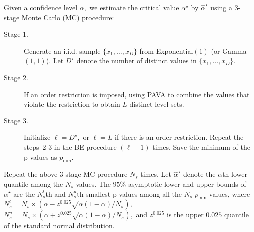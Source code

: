\documentclass[12pt] {article}
\begin{document}
Given a confidence level $\alpha,$ we estimate the critical value
$\alpha^\star$ by $\widehat{\alpha}^\star$ using a 3-stage Monte
Carlo (MC) procedure:
\begin{description}
\item[Stage 1.] Generate an i.i.d. sample $\{x_1,\ldots,x_D\}$
from Exponential$(1)$ (or Gamma$(1,1)$). Let $D^\star$ denote the number of distinct
values in $\{x_1,\ldots,x_D\}.$
\item[Stage 2.] If an order restriction is imposed, using PAVA
to combine the values that violate the restriction to obtain
$L$ distinct level sets.
\item[Stage 3.] Initialize $\ell = D^\star,$ or $\ell = L$ if
there is an order restriction. Repeat the steps~2-3 in the BE
procedure $(\ell-1)$ times. Save the minimum of the p-values
as $p_{\textrm{min}}$.
\end{description}
Repeat the above 3-stage MC procedure $N_s$ times. Let
$\widehat{\alpha}^\star$ denote the $\alpha$th lower
quantile among the $N_s$ values.
The $95\%$ asymptotic lower and upper bounds of $\alpha^\star$
are the $N_s^l$th and $N_s^u$th smallest p-values among all the
$N_s$ $p_{\textrm{min}}$ values, where
$N_s^l = N_s \times \left(\alpha - z^{0.025} \sqrt{\alpha (1-\alpha)/N_s}\right),$
$N_s^u = N_s \times \left(\alpha + z^{0.025} \sqrt{\alpha (1-\alpha)/N_s}\right),$
and $z^{0.025}$ is the upper $0.025$ quantile of the
standard normal distribution.
\end{document}
